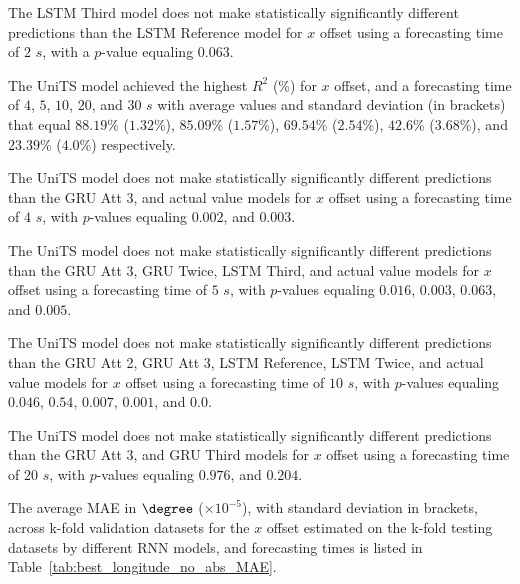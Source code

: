 The LSTM Third model does not make statistically significantly different predictions than the LSTM Reference model for $x$ offset using a forecasting time of $2$ $s$, with a $p$-value equaling $0.063$.

The UniTS model achieved the highest $R^{2}$ (\%) for $x$ offset, and a forecasting time of $4$, $5$, $10$, $20$, and $30$ $s$ with average values and standard deviation (in brackets) that equal $88.19$\% ($1.32$\%), $85.09$\% ($1.57$\%), $69.54$\% ($2.54$\%), $42.6$\% ($3.68$\%), and $23.39$\% ($4.0$\%) respectively.

The UniTS model does not make statistically significantly different predictions than the GRU Att 3, and actual value models for $x$ offset using a forecasting time of $4$ $s$, with $p$-values equaling $0.002$, and $0.003$.

The UniTS model does not make statistically significantly different predictions than the GRU Att 3, GRU Twice, LSTM Third, and actual value models for $x$ offset using a forecasting time of $5$ $s$, with $p$-values equaling $0.016$, $0.003$, $0.063$, and $0.005$.

The UniTS model does not make statistically significantly different predictions than the GRU Att 2, GRU Att 3, LSTM Reference, LSTM Twice, and actual value models for $x$ offset using a forecasting time of $10$ $s$, with $p$-values equaling $0.046$, $0.54$, $0.007$, $0.001$, and $0.0$.

The UniTS model does not make statistically significantly different predictions than the GRU Att 3, and GRU Third models for $x$ offset using a forecasting time of $20$ $s$, with $p$-values equaling $0.976$, and $0.204$.

The average MAE in $\degree$ ($\times 10^{-5}$), with standard deviation in brackets, across k-fold validation datasets for the $x$ offset estimated on the k-fold testing datasets by different RNN models, and forecasting times is listed in Table~\ref{tab:best_longitude_no_abs_MAE}.

